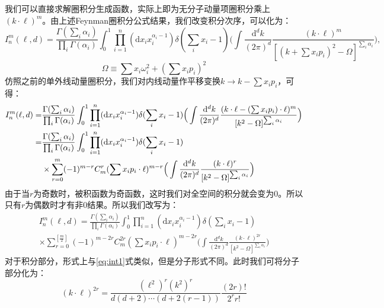 我们可以直接求解圈积分生成函数，实际上即为无分子动量项圈积分乘上$(k\cdot\ell)^m$。由上述Feynman圈积分公式结果，我们改变积分次序，可以化为：
	\begin{equation}
	I^m_n(\ell,d)=\frac{\Gamma(\sum_i\alpha_i)}{\prod_i\Gamma(\alpha_i)}\int_0^1\prod_{i=1}^n(\mathrm{d}x_i x_i^{\alpha_i-1})\delta(\sum_i x_i-1)\Big(\int\frac{\mathrm{d}^dk}{(2\pi)^d}\frac{(k\cdot\ell)^m}{[(k+\sum x_ip_i)^2-\Omega]^{\sum_i\alpha_i}}\Big),
	\end{equation}
\begin{equation}
\Omega\equiv\sum x_i\omega_i^2+(\sum x_i p_i)^2
\end{equation}
仿照之前的单外线动量圈积分，我们对内线动量作平移变换$k\rightarrow k-\sum x_ip_i$，可得：
	\begin{align}
	I^m_n(\ell,d)=&\frac{\Gamma(\sum_i\alpha_i)}{\prod_i\Gamma(\alpha_i)}\int_0^1\prod_{i=1}^n(\mathrm{d}x_i x_i^{\alpha_i-1})\delta(\sum_i x_i-1)\Big(\int\frac{\mathrm{d}^dk}{(2\pi)^d}\frac{(k\cdot\ell-(\sum x_ip_i)\cdot\ell)^m}{[k^2-\Omega]^{\sum_i\alpha_i}}\Big)\notag\\
	=&\frac{\Gamma(\sum_i\alpha_i)}{\prod_i\Gamma(\alpha_i)}\int_0^1\prod_{i=1}^n(\mathrm{d}x_i x_i^{\alpha_i-1})\delta(\sum_i x_i-1)\notag\\
	&\times\sum_{r=0}^{m}(-1)^{m-r}C_m^r(\sum x_ip_i\cdot\ell)^{m-r}\Big(\int\frac{\mathrm{d}^dk}{(2\pi)^d}\frac{(k\cdot\ell)^r}{[k^2-\Omega]^{\sum_i\alpha_i}}\Big)
	\end{align}
由于当$r$为奇数时，被积函数为奇函数，这时我们对全空间的积分就会变为0。所以只有$r$为偶数时才有非0结果。所以我们改写为：
\begin{multline}
I^m_n(\ell,d)=\frac{\Gamma(\sum_i\alpha_i)}{\prod_i\Gamma(\alpha_i)}\int_0^1\prod_{i=1}^n(\mathrm{d}x_i x_i^{\alpha_i-1})\delta(\sum_i x_i-1)\\\times\sum_{r=0}^{[\frac{m}{2}]}(-1)^{m-2r}C_m^{2r}(\sum x_ip_i\cdot\ell)^{m-2r}\Big(\int\frac{\mathrm{d}^dk}{(2\pi)^d}\frac{(k\cdot\ell)^{2r}}{[k^2-\Omega]^{\sum_i\alpha_i}}\Big)
\end{multline}
对于积分部分，形式上与\eqref{eq:int1}式类似，但是分子形式不同。此时我们可将分子部分化为：
\begin{equation}
(k\cdot\ell)^{2r}=\frac{(\ell^2)^r(k^2)^r}{d(d+2)\cdots(d+2(r-1))}\frac{(2r)!}{2^r r!}
\end{equation}
